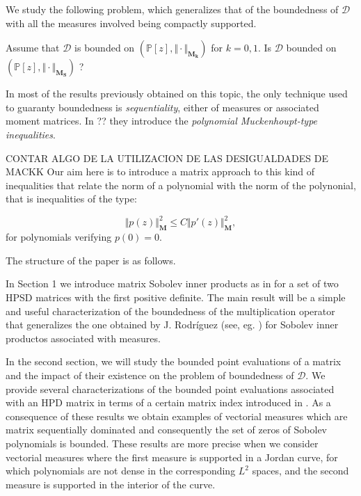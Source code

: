 \documentclass[12pt]{amsart}
\theoremstyle{definition}
\theoremstyle{plain}
\theoremstyle{remark}
\begin{document}
\noindent We study the following problem, which generalizes that of the boundedness of $\mathcal{D}$ with all the measures involved being compactly supported.

\medskip 


Assume that $\mathcal{D}$ is bounded on $(\mathbb{P}[z], \Vert \cdot \Vert_{\mathbf{M_k}})$ for $k=0,1$. Is $\mathcal{D}$ bounded on $(\mathbb{P}[z], \Vert \cdot \Vert_{\mathbf{M_S}})$ ?

\medskip


\noindent In most of the results previously obtained on this topic, the only technique used to guaranty boundedness is {\it sequentiality}, either of measures or associated moment matrices.  In ?? they introduce the {\it polynomial Muckenhoupt-type  inequalities}. 

CONTAR ALGO DE LA UTILIZACION DE LAS DESIGUALDADES DE MACKK
Our aim here is to introduce a matrix approach to this kind of inequalities that relate the norm of a polynomial with the norm of the polynonial, that is inequalities of the type: 


\begin{equation}\label{Muckenhoupt}
  \Vert p(z) \Vert^{2}_{\mathbf{M}} \leq C\Vert p'(z) \Vert^{2}_{\mathbf{M}}, 
\end{equation}
\noindent for polynomials verifying $p(0)=0$. 


\bigskip
\noindent The structure of the paper is as follows. 

\medskip

\noindent In Section 1 we introduce matrix Sobolev inner products as in \cite{EG23} for a set of two HPSD matrices with the first positive definite. The main result will be a simple and useful characterization of the boundedness of the multiplication operator that generalizes the one obtained by J. Rodríguez (see, eg. \cite{JR1})  for Sobolev inner productos associated with measures.

\medskip

\noindent In the second section, we will study the bounded point evaluations of a matrix and the impact of their existence on the problem of boundedness of $\mathcal{D}$. 
We provide several characterizations of the bounded point evaluations associated with an HPD matrix
in terms of a certain matrix index introduced in \cite{EGT6}.
As a consequence of these results we obtain examples of vectorial measures which are matrix sequentially dominated and consequently the set of zeros of Sobolev polynomials is bounded. These results are more precise when we consider vectorial measures where the first measure is supported in a Jordan curve, for which polynomials are not dense in the corresponding $L^{2}$ spaces, and the second measure is supported in the interior of the curve.  
\end{document}
